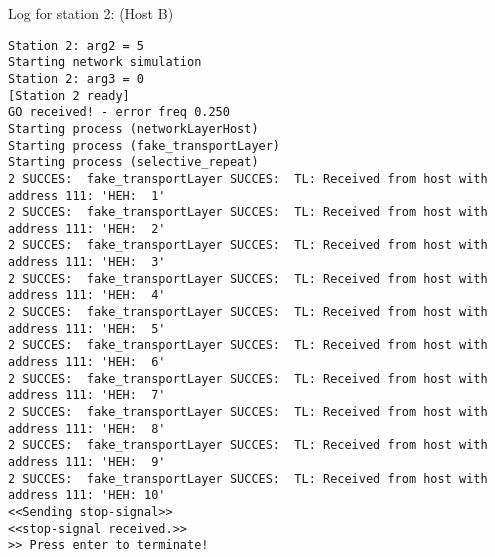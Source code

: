 Log for station 2: (Host B)
\begin{Verbatim}[frame=single]
Station 2: arg2 = 5
Starting network simulation
Station 2: arg3 = 0
[Station 2 ready]
GO received! - error freq 0.250
Starting process (networkLayerHost)
Starting process (fake_transportLayer)
Starting process (selective_repeat)
2 SUCCES:  fake_transportLayer SUCCES:  TL: Received from host with address 111: 'HEH:  1'
2 SUCCES:  fake_transportLayer SUCCES:  TL: Received from host with address 111: 'HEH:  2'
2 SUCCES:  fake_transportLayer SUCCES:  TL: Received from host with address 111: 'HEH:  3'
2 SUCCES:  fake_transportLayer SUCCES:  TL: Received from host with address 111: 'HEH:  4'
2 SUCCES:  fake_transportLayer SUCCES:  TL: Received from host with address 111: 'HEH:  5'
2 SUCCES:  fake_transportLayer SUCCES:  TL: Received from host with address 111: 'HEH:  6'
2 SUCCES:  fake_transportLayer SUCCES:  TL: Received from host with address 111: 'HEH:  7'
2 SUCCES:  fake_transportLayer SUCCES:  TL: Received from host with address 111: 'HEH:  8'
2 SUCCES:  fake_transportLayer SUCCES:  TL: Received from host with address 111: 'HEH:  9'
2 SUCCES:  fake_transportLayer SUCCES:  TL: Received from host with address 111: 'HEH: 10'
<<Sending stop-signal>>
<<stop-signal received.>>
>> Press enter to terminate!
\end{Verbatim}




















